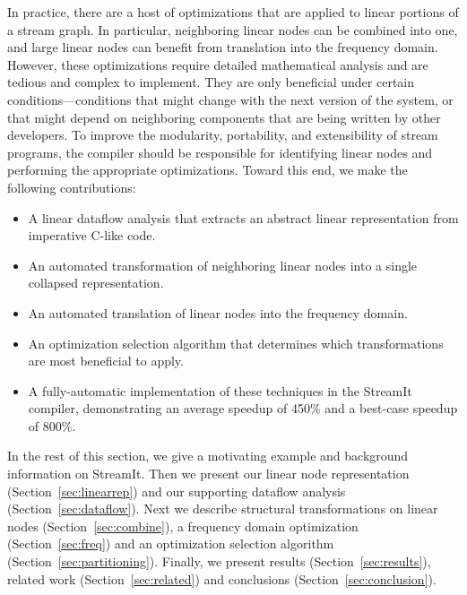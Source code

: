 \documentclass{sig-alternate}
\begin{document}
In practice, there are a host of optimizations that are applied to
linear portions of a stream graph.  In particular, neighboring linear
nodes can be combined into one, and large linear nodes can benefit
from translation into the frequency domain.  However, these
optimizations require detailed mathematical analysis and are tedious
and complex to implement.  They are only beneficial under certain
conditions---conditions that might change with the next version of the
system, or that might depend on neighboring components that are being
written by other developers.  To improve the modularity, portability,
and extensibility of stream programs, the compiler should be
responsible for identifying linear nodes and performing the
appropriate optimizations.  Toward this end, we make the following
contributions:
\begin{itemize}
\vspace{-6pt}

\item A linear dataflow analysis that extracts an abstract linear
representation from imperative C-like code.
\vspace{-6pt}

\item An automated transformation of neighboring linear nodes into a
single collapsed representation.
\vspace{-6pt}

\item An automated translation of linear nodes into the frequency
domain.
\vspace{-6pt}

\item An optimization selection algorithm that determines which
transformations are most beneficial to apply.
\vspace{-6pt}

\item A fully-automatic implementation of these techniques in the
StreamIt compiler, demonstrating an average speedup of 450\% and a
best-case speedup of 800\%.
\vspace{-6pt}

\end{itemize}
In the rest of this section, we give a motivating example and
background information on StreamIt.  Then we present our linear node
representation (Section~\ref{sec:linearrep}) and our supporting
dataflow analysis (Section~\ref{sec:dataflow}).  Next we describe
structural transformations on linear nodes
(Section~\ref{sec:combine}), a frequency domain optimization
(Section~\ref{sec:freq}) and an optimization selection algorithm
(Section~\ref{sec:partitioning}). Finally, we present results
(Section~\ref{sec:results}), related work (Section~\ref{sec:related})
and conclusions (Section~\ref{sec:conclusion}).
\end{document}
